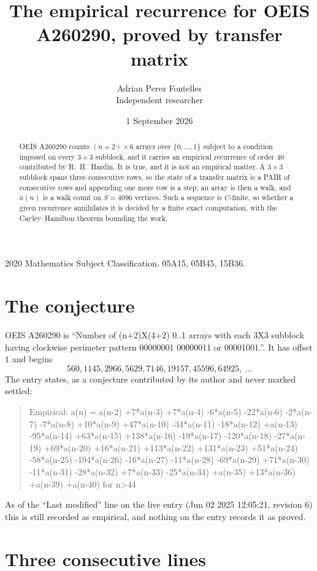 \documentclass[11pt,a4paper]{article}
\title{The empirical recurrence for OEIS A260290, proved by transfer matrix}
\author{Adrian Perez Fontelles\\ \small Independent researcher}
\date{1 September 2026}
\theoremstyle{plain}
\theoremstyle{definition}
\begin{document}
\maketitle

\begin{abstract}
OEIS A260290 counts $(n+2)\times6$ arrays over $\{0,\dots,1\}$ subject to a condition imposed on
every $3\times3$ subblock, and it carries an empirical recurrence of order $40$
contributed by R.~H.~Hardin. It is true, and it is not an empirical matter. A $3\times3$
subblock spans three consecutive rows, so the state of a transfer matrix is a PAIR of
consecutive rows and appending one more row is a step; an array is then a walk, and
$a(n)$ is a walk count on $S=4096$ vertices. Such a sequence is $C$-finite, so whether a given
recurrence annihilates it is decided by a finite exact computation, with the Cayley--Hamilton
theorem bounding the work.
\end{abstract}

\noindent\small 2020 Mathematics Subject Classification. 05A15, 05B45, 15B36.\normalsize

\section{The conjecture}

OEIS A260290 is ``Number of (n+2)X(4+2) 0..1 arrays with each 3X3 subblock having clockwise perimeter pattern 00000001 00000011 or 00001001.''. It has offset $1$ and begins
\[
560, 1145, 2966, 5629, 7146, 19157, 45596, 64925,\ \dots
\]
The entry states, as a conjecture contributed by its author and never marked settled:
\begin{quote}
Empirical: a(n) = a(n-2) +7*a(n-3) +7*a(n-4) -6*a(n-5) -22*a(n-6) -2*a(n-7) -7*a(n-8) +10*a(n-9) +47*a(n-10) -34*a(n-11) -18*a(n-12) +a(n-13) -95*a(n-14) +63*a(n-15) +138*a(n-16) -19*a(n-17) -120*a(n-18) -27*a(n-19) +69*a(n-20) +16*a(n-21) +113*a(n-22) +131*a(n-23) +51*a(n-24) -58*a(n-25) -194*a(n-26) -16*a(n-27) -11*a(n-28) -69*a(n-29) +71*a(n-30) -11*a(n-31) -28*a(n-32) +7*a(n-33) -25*a(n-34) +a(n-35) +13*a(n-36) +a(n-39) +a(n-40) for n>44
\end{quote}
As of the ``Last modified'' line on the live entry (Jun 02 2025 12:05:21, revision 6) this is still
recorded as empirical, and nothing on the entry records it as proved.

\section{Three consecutive lines}
\end{document}
